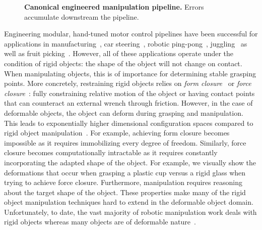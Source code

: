 \begin{figure}[htbp!]
    \centering
    
    \caption[Canonical engineered manipulation pipeline.]{\textbf{Canonical engineered manipulation pipeline.} Errors accumulate downstream the pipeline.
    }
    \label{fig:canonical_robotic_manipulation_engineered_pipeline}
\end{figure}

Engineering modular, hand-tuned motor control pipelines have been successful for applications in manufacturing~\autocite{Clocksin1985,Mochizuki1987}, car steering~\autocite{Dickmanns1988}, robotic ping-pong~\autocite{Andersson1987}, juggling~\autocite{Rizzi1993} as well as fruit picking~\autocite{Harrell1989}. However, all of these applications operate under the condition of rigid objects: the shape of the object will not change on contact. When manipulating objects, this is of importance for determining stable grasping points. More concretely, restraining rigid objects relies on \textit{form closure}~\autocite{Nguyen1988} or \textit{force closure}~\autocite{Bicchi1995}: fully constraining relative motion of the object or having contact points that can counteract an external wrench through friction. 
However, in the case of deformable objects, the object can deform during grasping and manipulation. This leads to exponentially higher dimensional configuration spaces compared to rigid object manipulation~\autocite{Foresti2004}. For example, achieving form closure becomes impossible as it requires immobilizing every degree of freedom. Similarly, force closure becomes computationally intractable as it requires constantly incorporating the adapted shape of the object. For example, we visually show the deformations that occur when grasping a plastic cup versus a rigid glass when trying to achieve force closure. Furthermore, manipulation requires reasoning about the target shape of the object. These properties make many of the rigid object manipulation techniques hard to extend in the deformable object domain. Unfortunately, to date, the vast majority of robotic manipulation work deals with rigid objects whereas many objects are of deformable nature~\autocite{Siciliano2008}.

